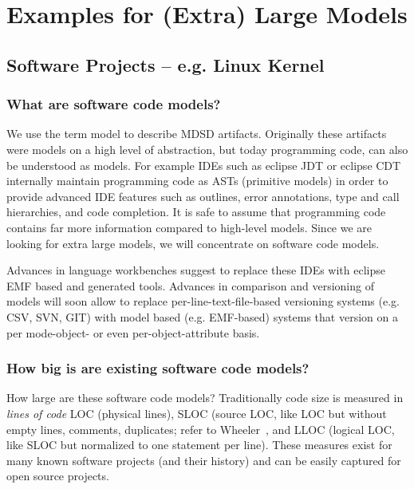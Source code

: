 \section{Examples for (Extra) Large Models}

\subsection{Software Projects -- e.g. Linux Kernel}

\subsubsection{What are software code models?}
We use the term model to describe MDSD artifacts. Originally these artifacts were models on a high level of abstraction, but today programming code, can also be understood as models. For example IDEs such as eclipse JDT or eclipse CDT internally maintain programming code as ASTs (primitive models) in order to provide advanced IDE features such as outlines, error annotations, type and call hierarchies, and code completion. It is safe to assume that programming code contains far more information compared to high-level models. Since we are looking for extra large models, we will concentrate on software code models.

Advances in language workbenches suggest to replace these IDEs with eclipse EMF based and generated tools. Advances in comparison and versioning of models will soon allow to replace per-line-text-file-based versioning systems (e.g. CSV, SVN, GIT) with model based (e.g. EMF-based) systems that version on a per mode-object- or even per-object-attribute basis.

\subsubsection{How big is are existing software code models?}
How large are these software code models? Traditionally code size is measured in \emph{lines of code} LOC (physical lines), SLOC (source LOC, like LOC but without empty lines, comments, duplicates; refer to Wheeler~\cite{wheeler}, and LLOC (logical LOC, like SLOC but normalized to one statement per line). These measures exist for many known software projects (and their history) and can be easily captured for open source projects. 

